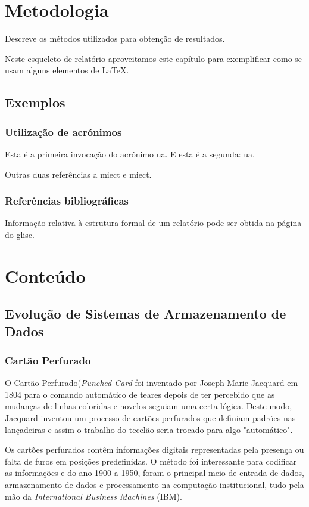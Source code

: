 \documentclass{report}
\begin{document}
\chapter{Metodologia}
\label{chap.metodologia}
Descreve os métodos utilizados para obtenção de resultados.

Neste esqueleto de relatório aproveitamos este capítulo para exemplificar
como se usam alguns elementos de {\LaTeX}.

\section{Exemplos}

\subsection{Utilização de acrónimos}
Esta é a primeira invocação do acrónimo \ac{ua}.
E esta é a segunda: \ac{ua}.

Outras duas referências a \ac{miect}
e \ac{miect}.

\subsection{Referências bibliográficas}
Informação relativa à estrutura formal de um relatório pode ser obtida
na página do \ac{glisc}\cite{glisc}.

\newpage
\chapter{Conteúdo}
\label{chap.conteúdo}
	\section{Evolução de Sistemas de Armazenamento de Dados}
		\subsection{Cartão Perfurado}
		O Cartão Perfurado(\textit{Punched Card} foi inventado por Joseph-Marie Jacquard em 1804 para o comando automático de teares depois de ter percebido que as mudanças de linhas coloridas e novelos  seguiam uma certa lógica. Deste modo, Jacquard inventou um processo de cartões perfurados que definiam padrões nas lançadeiras e assim o trabalho do tecelão seria trocado para algo "automático". 
		
		Os cartões perfurados contêm informações digitais representadas pela presença ou falta de furos em posições predefinidas. O método foi interessante para codificar as informações e do ano 1900 a 1950, foram o principal meio de entrada de dados, armazenamento de dados e processamento na computação institucional, tudo pela mão da \textit{International Business Machines} (IBM). 
		
\end{document}
